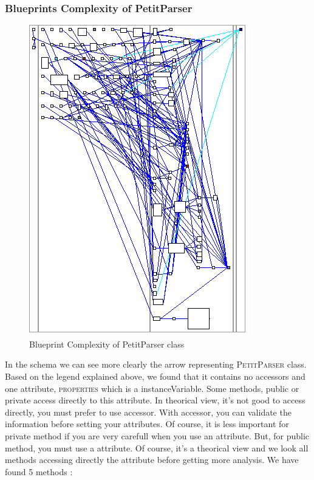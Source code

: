 \subsubsection{Blueprints Complexity of PetitParser}
\begin{figure}[ht]
\centering
\label{blueprint_pparser}
\includegraphics[scale=0.35]{blueprint_pparser.png}
\caption{Blueprint Complexity of PetitParser class}
\end{figure}
In the schema we can see more clearly the arrow representing \textsc{PetitParser} class.\\
Based on the legend explained above, we found that it contains no accessors and one attribute, \textsc{properties} which is a instanceVariable.  Some methods, public or private access directly to this attribute.  In theorical view, it's not good to access directly, you must prefer to use accessor.  With accessor, you can validate the information before setting your attributes.  Of course, it is less important for private method if you are very carefull when you use an attribute.  But, for public method, you must use a attribute.
Of course, it's a theorical view and we look all methods accessing directly the attribute before getting more analysis.  We have found 5 methods : 
